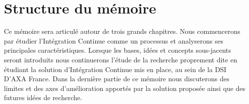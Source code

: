 \documentclass{report}
\begin{document}
    \section{Structure du mémoire}
    Ce mémoire sera articulé autour de trois grands chapitres. Nous commencerons par étudier l'Intégration Continue comme un processus et analyserons ses principales caractéristiques. Lorsque les bases, idées et concepts sous-jacents seront introduits nous continuerons l'étude de la recherche proprement dite en étudiant la solution d'Intégration Continue mis en place, au sein de la DSI D'AXA France. Dans la dernière partie de ce mémoire nous discuterons des limites et des axes d'amélioration apportés par la solution proposée ainsi que des futures idées de recherche.


  

  

  

  \printglossaries
  \listoffigures                  %
  \appendix
  \label{CloudComputing}
\end{document}
